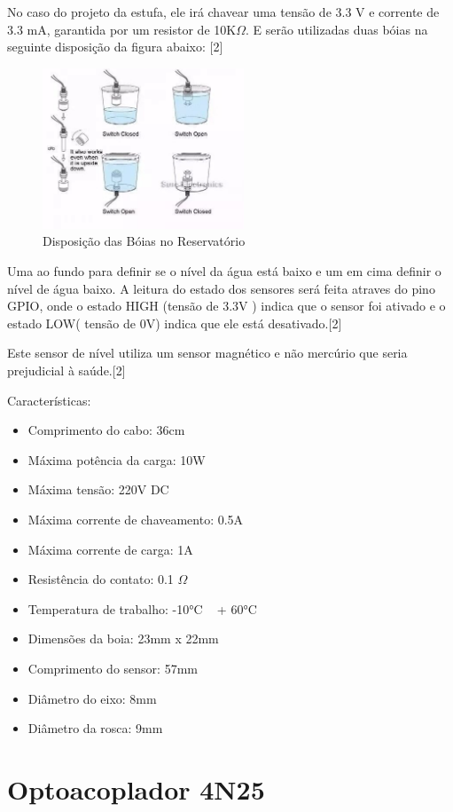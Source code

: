 No caso do projeto da estufa, ele irá chavear uma tensão de 3.3 V e corrente de 3.3 mA, garantida por um resistor de 10K$\Omega$. E serão utilizadas duas bóias na seguinte disposição da figura abaixo: [2]

\begin{figure}[H]
	\centering
	\includegraphics[width=6cm]{figuras/eletronica_1.png}
	\caption{Disposição das Bóias no Reservatório} \label{eletronica_1}
\end{figure}

Uma ao fundo para definir se o nível da água está baixo e um em cima definir o nível de água baixo.  A leitura do estado dos sensores será feita atraves do pino GPIO, onde o estado HIGH (tensão de 3.3V ) indica que o sensor foi ativado e o estado LOW( tensão de 0V) indica que ele está desativado.[2]

Este sensor de nível utiliza um sensor magnético e não mercúrio que seria prejudicial à saúde.[2]

Características:

\begin{itemize}
	\item Comprimento do cabo: 36cm
	\item Máxima potência da carga: 10W
	\item Máxima tensão: 220V DC
	\item Máxima corrente de chaveamento: 0.5A
	\item Máxima corrente de carga: 1A
	\item Resistência do contato: 0.1 $\Omega$
	\item Temperatura de trabalho: -10°C ~ + 60°C
	\item Dimensões da boia: 23mm x 22mm
	\item Comprimento do sensor: 57mm
	\item Diâmetro do eixo: 8mm
	\item Diâmetro da rosca: 9mm
\end{itemize}

\section{Optoacoplador 4N25}

